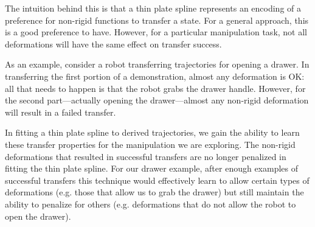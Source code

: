 The intuition behind this is that a thin plate spline represents an encoding of a preference
for non-rigid functions to transfer a state. For a general approach, this is a good
preference to have. However, for a particular manipulation task, not all deformations
will have the same effect on transfer success. 

As an example, consider a robot transferring
trajectories for opening a drawer. In transferring the first portion of a demonstration,
almost any deformation is OK: all that needs to happen is that the robot grabs the drawer handle.
However, for the second part---actually opening the drawer---almost any non-rigid deformation
will result in a failed transfer.

In fitting a thin plate spline to derived trajectories, we gain the ability 
to learn these transfer properties for the manipulation we are exploring.
The non-rigid deformations that resulted in successful transfers are no longer
penalized in fitting the thin plate spline. For our drawer example, after enough
examples of successful transfers this technique would effectively learn to allow
certain types of deformations (e.g. those that allow us to grab the drawer) but still
maintain the ability to penalize for others (e.g. deformations that do not allow the robot to
open the drawer).


